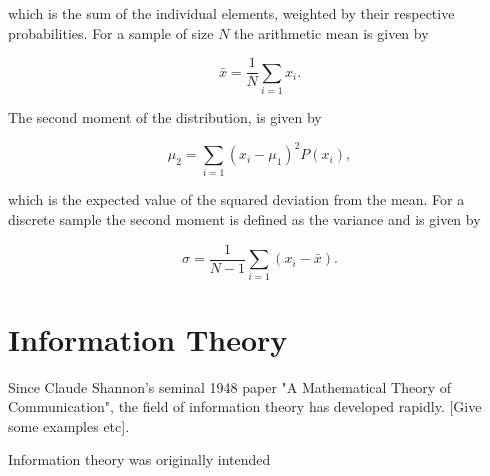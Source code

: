 \noindent which is the sum of the individual elements, weighted by their respective probabilities. For a sample of size $N$ the arithmetic mean is given by 

\begin{equation}
\bar{x} = \frac{1}{N}\sum_{i=1}{x_i}.
\end{equation}

\noindent The second moment of the distribution, is given by

\begin{equation}
\mu_2 = \sum_{i=1}{(x_i - \mu_1)^{2}P(x_i)},
\end{equation}

\noindent which is the expected value of the squared deviation from the mean. For a discrete sample the second moment is defined as the variance and is given by 

\begin{equation}
\sigma = \frac{1}{N-1}\sum_{i=1}{(x_i - \bar{x})}.
\end{equation}

\section{Information Theory}

Since Claude Shannon's seminal 1948 paper "A Mathematical Theory of Communication", the field of information theory has developed rapidly. [Give some examples etc].

Information theory was originally intended 


